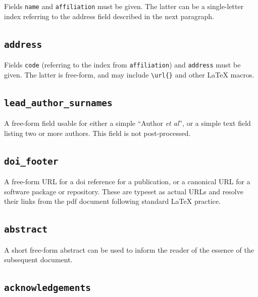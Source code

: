 \documentclass[letterpaper,9pt,twocolumn,twoside,]{pinp}
\begin{document}
Fields \texttt{name} and \texttt{affiliation} must be given. The latter
can be a single-letter index referring to the address field described in
the next paragraph.

\hypertarget{address}{%
\subsection{\texorpdfstring{\texttt{address}}{address}}\label{address}}

Fields \texttt{code} (referring to the index from \texttt{affiliation})
and \texttt{address} must be given. The latter is free-form, and may
include \texttt{\textbackslash{}url\{\}} and other LaTeX macros.

\hypertarget{lead_author_surnames}{%
\subsection{\texorpdfstring{\texttt{lead\_author\_surnames}}{lead\_author\_surnames}}\label{lead_author_surnames}}

A free-form field usable for either a simple ``Author \emph{et al}'', or
a simple text field listing two or more authors. This field is not
post-processed.

\hypertarget{doi_footer}{%
\subsection{\texorpdfstring{\texttt{doi\_footer}}{doi\_footer}}\label{doi_footer}}

A free-form URL for a doi reference for a publication, or a canonical
URL for a software package or repository. These are typeset as actual
URLs and resolve their links from the pdf document following standard
LaTeX practice.

\hypertarget{abstract}{%
\subsection{\texorpdfstring{\texttt{abstract}}{abstract}}\label{abstract}}

A short free-form abstract can be used to inform the reader of the
essence of the subsequent document.

\hypertarget{acknowledgements}{%
\subsection{\texorpdfstring{\texttt{acknowledgements}}{acknowledgements}}\label{acknowledgements}}
\end{document}
